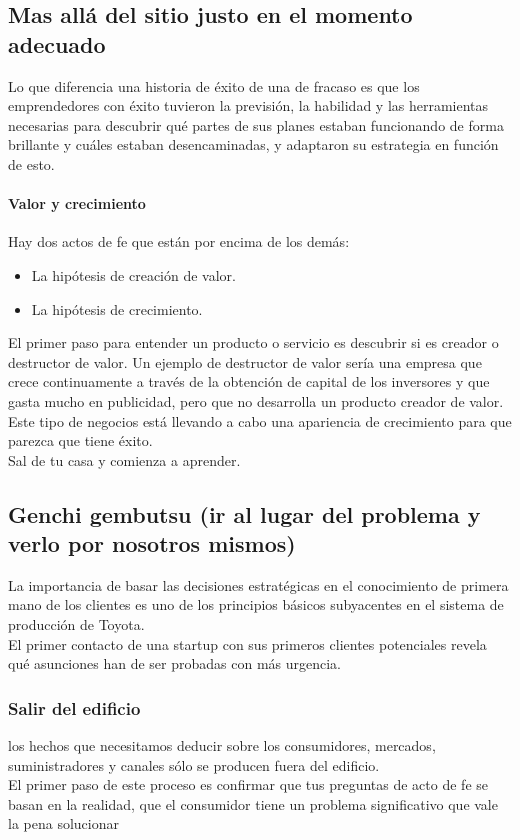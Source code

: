 \documentclass[10pt]{article}
\begin{document}
\begin{multicols}{2}
\subsection*{Mas allá del sitio justo en el momento adecuado} 
Lo que diferencia una historia de éxito de una de fracaso es que los emprendedores con éxito tuvieron la previsión, la habilidad y las herramientas necesarias para descubrir qué partes de sus planes estaban funcionando de forma brillante y cuáles estaban desencaminadas, y adaptaron su estrategia en función de esto.
\paragraph*{Valor y crecimiento}
Hay dos actos de fe que están por encima de los demás:
\begin{itemize}
\item La hipótesis de creación de valor.
\item La hipótesis de crecimiento.
\end{itemize}
El primer paso para entender un producto o servicio es descubrir si es creador o destructor de valor. Un ejemplo de destructor de valor sería una empresa que crece continuamente a través de la obtención de capital de los inversores y que gasta mucho en publicidad, pero que no desarrolla un producto creador de valor. Este tipo de negocios está llevando a cabo una apariencia de crecimiento para que parezca que tiene éxito. \\
{\color{blue} Sal de tu casa y comienza a aprender.}
\subsection*{Genchi gembutsu (ir al lugar del problema y verlo por nosotros mismos)}
La importancia de basar las decisiones estratégicas en el conocimiento de primera mano de los clientes es uno de los principios básicos subyacentes en el sistema de producción de Toyota. \\
El primer contacto de una startup con sus primeros clientes potenciales revela qué asunciones han de ser probadas con más urgencia.
\subsubsection*{Salir del edificio}
los hechos que necesitamos deducir sobre los consumidores, mercados, suministradores y canales sólo se producen fuera del edificio.\\
{\color{blue} El primer paso de este proceso es confirmar que tus preguntas de acto de fe se basan en la realidad, que el consumidor tiene un problema significativo que vale la pena solucionar}

\end{multicols}
\end{document}
